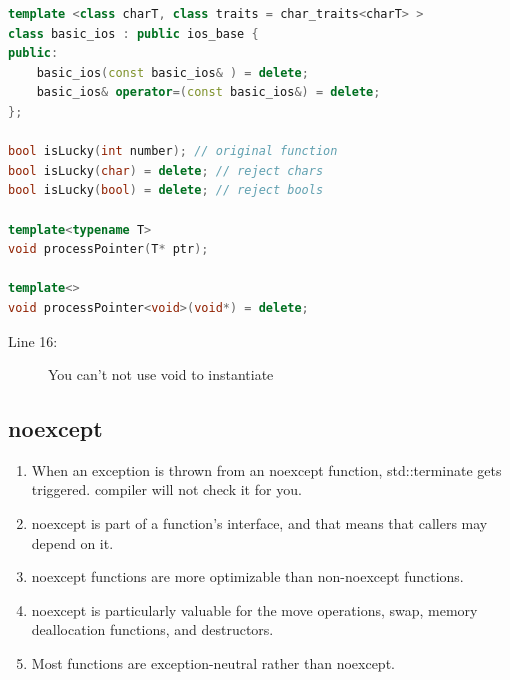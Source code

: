 \documentclass[a4paper,11pt,twoside]{book}
\begin{document}
\begin{lstlisting}[frame=single, language=c++]
template <class charT, class traits = char_traits<charT> >
class basic_ios : public ios_base {
public:
	basic_ios(const basic_ios& ) = delete;
	basic_ios& operator=(const basic_ios&) = delete;
};

bool isLucky(int number); // original function
bool isLucky(char) = delete; // reject chars
bool isLucky(bool) = delete; // reject bools

template<typename T>
void processPointer(T* ptr);

template<>
void processPointer<void>(void*) = delete;
\end{lstlisting} 
\begin{description}
	\item[Line 16:] You can't not use void to instantiate
\end{description}

\subsection{noexcept}

\begin{enumerate}

\item  When an exception is thrown from an noexcept function, std::terminate gets triggered. compiler will not check it for you.

\item noexcept is part of a function's interface, and that means that callers may
depend on it.

\item noexcept functions are more optimizable than non-noexcept functions.

\item noexcept is particularly valuable for the move operations, swap, memory deallocation functions, and destructors.

\item Most functions are exception-neutral rather than noexcept.

\end{enumerate}
\end{document}
